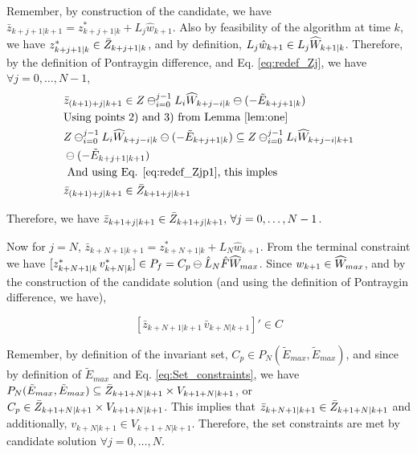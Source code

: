 Remember, by construction of the candidate, we have $\bar{z}_{k+j+1|k+1} = z^{*}_{k+j+1|k} + L_j\hat{w}_{k+1}$.
Also by feasibility of the algorithm at time $k$, we have $z^{*}_{k+j+1|k}\in \bar{Z}_{k+j+1|k}$, and by definition, $L_j\hat{w}_{k+1} \in L_j\widehat{W}_{k+1|k}$. Therefore, by the definition of Pontraygin difference, and Eq. \ref{eq:redef_Zj}, we have $\forall j=0,\dotsc,N-1$,
\begin{subequations}
\begin{align}
&\bar{z}_{(k+1)+j|k+1} \in Z \ominus_{i=0}^{j-1}L_i\widehat{W}_{k+j-i|k} \ominus (-\tilde{E}_{k+j+1|k}) \\
&\text{Using points 2) and 3) from Lemma \ref{lem:one} } \nonumber \\ 
&Z \ominus_{i=0}^{j-1}L_i\widehat{W}_{k+j-i|k} \ominus (-\tilde{E}_{k+j+1|k}) \subseteq Z \ominus_{i=0}^{j-1}L_i\widehat{W}_{k+j-i|k+1}  \nonumber \\
& \ominus (-\tilde{E}_{k+j+1|k+1}) \\
&\text{ And using Eq. \ref{eq:redef_Zjp1}, this imples } \nonumber \\
&\bar{z}_{(k+1)+j|k+1} \in \bar{Z}_{k+1+j|k+1}
\end{align} 
\end{subequations}

Therefore, we have $\bar{z}_{k+1+j|k+1} \in \bar{Z}_{k+1+j|k+1},\,\forall j=0,\dotsc,N-1$. 

Now for $j=N$, $\bar{z}_{k+N+1|k+1} = z^{*}_{k+N+1|k} + L_N\hat{w}_{k+1}$. From the terminal constraint we have $[z^{*}_{k+N+1|k}\, v^{*}_{k+N|k}] \in P_f = C_p \ominus \hat{L}_N\hat{F}\widehat{W}_{max}$. Since $w_{k+1} \in \widehat{W}_{max}$, and by the construction of the candidate solution (and using the definition of Pontraygin difference, we have), 

\begin{equation}
\label{eq:CandidateInC}
[\bar{z}_{k+N+1|k+1}\, \bar{v}_{k+N|k+1}]' \in C
\end{equation}

Remember, by definition of the invariant set, $C_p \in P_N(\tilde{E}_{max},\tilde{E}_{max})$, and since by definition of $\tilde{E}_{max}$ and Eq. \ref{eq:Set_constraints}, we have $P_N(\tilde{E}_{max},\tilde{E}_{max}) \subseteq \bar{Z}_{k+1+N|k+1} \times V_{k+1+N|k+1}$, or $C_p \in  \bar{Z}_{k+1+N|k+1} \times {V}_{k+1+N|k+1}$. This implies that $\bar{z}_{k+N+1|k+1} \in \bar{Z}_{k+1+N|k+1}$ and additionally, $v_{k+N|k+1} \in {V}_{k+1+N|k+1}$.
Therefore, the set constraints are met by candidate solution $\forall j=0,\dotsc,N$. 


